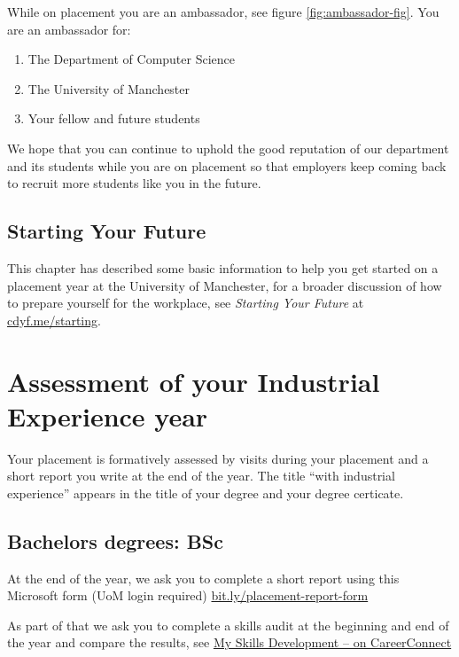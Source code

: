 \documentclass[
]{book}
\providecommand{\tightlist}{%
  \setlength{\itemsep}{0pt}\setlength{\parskip}{0pt}}
\begin{document}
While on placement you are an ambassador, see figure \ref{fig:ambassador-fig}. You are an ambassador for:

\begin{enumerate}
\def\labelenumi{\arabic{enumi}.}
\tightlist
\item
  The Department of Computer Science
\item
  The University of Manchester
\item
  Your fellow and future students
\end{enumerate}

We hope that you can continue to uphold the good reputation of our department and its students while you are on placement so that employers keep coming back to recruit more students like you in the future.

\section{Starting Your Future}\label{etc}

This chapter has described some basic information to help you get started on a placement year at the University of Manchester, for a broader discussion of how to prepare yourself for the workplace, see \emph{Starting Your Future} at \href{https://www.cdyf.me/starting}{cdyf.me/starting}. \citep{starting}

\chapter{Assessment of your Industrial Experience year}\label{assessment}

Your placement is formatively assessed by visits during your placement and a short report you write at the end of the year. The title ``with industrial experience'' appears in the title of your degree and your degree certicate.

\section{Bachelors degrees: BSc}\label{bsc}

At the end of the year, we ask you to complete a short report using this Microsoft form (UoM login required) \href{https://bit.ly/placement-report-form}{bit.ly/placement-report-form}

As part of that we ask you to complete a skills audit at the beginning and end of the year and compare the results, see \href{https://www.careers.manchester.ac.uk/options/skills/myskills}{My Skills Development -- on CareerConnect} \citep{audit}
\end{document}
